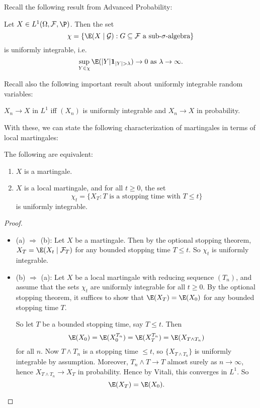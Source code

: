 \documentclass[a4paper]{article}
\begin{document}
Recall the following result from Advanced Probability:
\begin{prop}
  Let $X \in L^1 (\Omega, \mathcal{F}, \P)$. Then the set
  \[
    \chi = \{\E(X \mid \mathcal{G}): G \subseteq \mathcal{F}\text{ a sub-$\sigma$-algebra}\}
  \]
  is uniformly integrable, i.e.
  \[
    \sup_{Y \in \chi} \E (|Y| \mathbf{1}_{|Y| > \lambda}) \to 0\text{ as } \lambda \to \infty.
  \]
\end{prop}

Recall also the following important result about uniformly integrable random variables:
\begin{thm}
  $X_n \to X$ in $L^1$ iff $(X_n)$ is uniformly integrable and $X_n \to X$ in probability.
\end{thm}

With these, we can state the following characterization of martingales in terms of local martingales:
\begin{prop}
  The following are equivalent:
  \begin{enumerate}
    \item $X$ is a martingale.
    \item $X$ is a local martingale, and for all $t \geq 0$, the set
      \[
        \chi_t = \{X_T: T\text{ is a stopping time with }T \leq t\}
      \]
      is uniformly integrable.
  \end{enumerate}
\end{prop}

\begin{proof}\leavevmode
  \begin{itemize}
    \item (a) $\Rightarrow$ (b): Let $X$ be a martingale. Then by the optional stopping theorem, $X_T = \E(X_t \mid \mathcal{F}_T)$ for any bounded stopping time $T \leq t$. So $\chi_t$ is uniformly integrable.
    \item (b) $\Rightarrow$ (a): Let $X$ be a local martingale with reducing sequence $(T_n)$, and assume that the sets $\chi_t$ are uniformly integrable for all $t \geq 0$. By the optional stopping theorem, it suffices to show that $\E(X_T) = \E(X_0)$ for any bounded stopping time $T$.

      So let $T$ be a bounded stopping time, say $T \leq t$. Then
      \[
        \E(X_0) = \E(X_0^{T_n}) = \E(X_T^{T_n}) = \E(X_{T \wedge T_n})
      \]
      for all $n$. Now $T \wedge T_n$ is a stopping time $\leq t$, so $\{X_{T \wedge T_n}\}$ is uniformly integrable by assumption. Moreover, $T_n \wedge T \to T$ almost surely as $n \to \infty$, hence $X_{T \wedge T_n} \to X_T$ in probability. Hence by Vitali, this converges in $L^1$. So
      \[
        \E(X_T) = \E(X_0).\qedhere
      \]%
  \end{itemize}
\end{proof}
\end{document}
